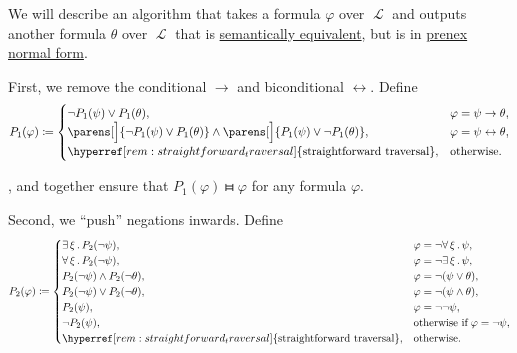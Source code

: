 \begin{algorithm}\label{alg:prenex_normal_form_conversion}
  We will describe an algorithm that takes a formula \( \varphi \) over \( \mscrL \) and outputs another formula \( \theta \) over \( \mscrL \) that is \hyperref[def:first_order_semantics/equivalence]{semantically equivalent}, but is in \hyperref[def:prenex_normal_form]{prenex normal form}.

  \begin{thmenum}
     First, we remove the conditional \( \rightarrow \) and biconditional \( \leftrightarrow \). Define
    \begin{equation*}
      P_1(\varphi) \coloneqq \begin{cases}
        \neg P_1(\psi) \vee P_1(\theta),                                                                          &\varphi = \psi \rightarrow \theta, \\
        \parens[\Big]{ \neg P_1(\psi) \vee P_1(\theta) } \wedge \parens[\Big]{ P_1(\psi) \vee \neg P_1(\theta) }, &\varphi = \psi \leftrightarrow \theta, \\
        \hyperref[rem:straightforward_traversal]{\T{straightforward traversal}},                                  &\T{otherwise.}
      \end{cases}
    \end{equation*}

    ,  and  together ensure that \( P_1(\varphi) \gleichstark \varphi \) for any formula \( \varphi \).

     Second, we \enquote{push} negations inwards. Define
    \begin{equation*}
      P_2(\varphi) \coloneqq \begin{cases}
        \qexists \xi P_2(\neg \psi),                                             &\varphi = \neg \qforall \xi \psi, \\
        \qforall \xi P_2(\neg \psi),                                             &\varphi = \neg \qexists \xi \psi, \\
        P_2(\neg \psi) \wedge P_2(\neg \theta),                                  &\varphi = \neg (\psi \vee \theta), \\
        P_2(\neg \psi) \vee P_2(\neg \theta),                                    &\varphi = \neg (\psi \wedge \theta), \\
        P_2(\psi),                                                               &\varphi = \neg \neg \psi, \\
        \neg P_2(\psi),                                                          &\T{otherwise if} \varphi = \neg \psi, \\
        \hyperref[rem:straightforward_traversal]{\T{straightforward traversal}}, &\T{otherwise.}
      \end{cases}
    \end{equation*}


\end{thmenum}
\end{algorithm}
